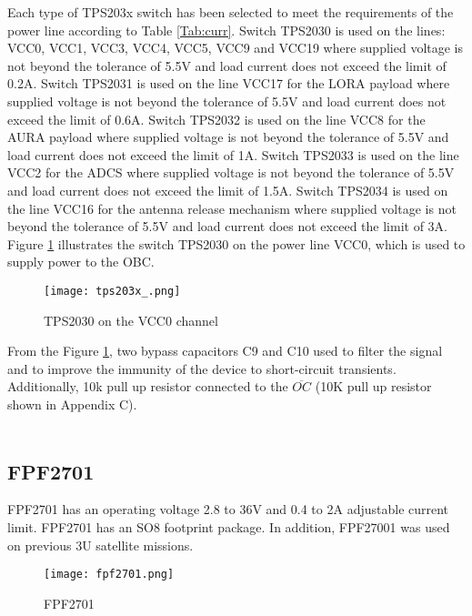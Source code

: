 Each type of TPS203x switch has been selected to meet the requirements of the power line according to Table \ref{Tab:curr}. Switch TPS2030 is used on the lines: VCC0, VCC1, VCC3, VCC4, VCC5, VCC9 and VCC19  where supplied voltage is not beyond the tolerance of 5.5V and load current does not exceed the limit of 0.2A. Switch TPS2031 is used on the line VCC17 for the LORA payload where supplied voltage is not beyond the tolerance of 5.5V and load current does not exceed the limit of 0.6A. Switch TPS2032 is used on the line VCC8 for the AURA payload where supplied voltage is not beyond the tolerance of 5.5V and load current does not exceed the limit of 1A. Switch TPS2033 is used on the line VCC2 for the ADCS where supplied voltage is not beyond the tolerance of 5.5V and load current does not exceed the limit of 1.5A. Switch TPS2034 is used on the line VCC16 for the antenna release mechanism where supplied voltage is not beyond the tolerance of 5.5V and load current does not exceed the limit of 3A. \\

Figure \ref{fig: vcc0} illustrates the switch TPS2030 on the power line VCC0, which is used to supply power to the OBC.

\begin{figure}[h]
	\centering
	\texttt{[image: tps203x\_.png]}
	\caption{TPS2030 on the VCC0 channel}
	\label{fig: vcc0}
\end{figure} 

From the Figure \ref{fig: vcc0}, two bypass capacitors C9 and C10 used to filter the signal and to improve the immunity of the device to short-circuit transients.   Additionally, 10k pull up resistor connected to the $\overline{OC}$ (10K pull up resistor shown in Appendix C). \\ \\

\subsection{FPF2701}

FPF2701 has an operating voltage 2.8 to 36V and 0.4 to 2A adjustable current limit. FPF2701 has an SO8 footprint package. In addition, FPF27001 was used on previous 3U satellite missions.\\

\begin{figure}[h]
	\centering
	\texttt{[image: fpf2701.png]}
	\caption{FPF2701 \cite{27}}
	\label{fig: fpf27}
\end{figure} 

